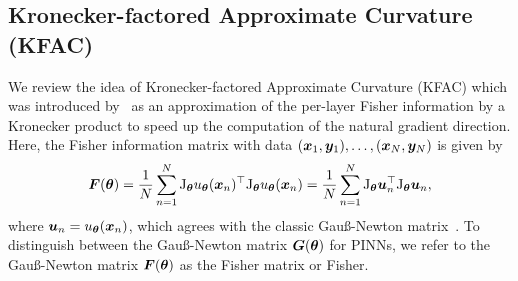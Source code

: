 \subsection{Kronecker-factored Approximate Curvature (KFAC)}


We review the idea of Kronecker-factored Approximate Curvature (KFAC) which was introduced by~\citet{heskes2000natural, martens2015optimizing} as an approximation of the per-layer Fisher information by a Kronecker product to speed up the computation of the natural gradient direction. 
Here, the Fisher information matrix with data $({\bm{x}}_1, {\bm{y}}_1), \dots, ({\bm{x}}_N, {\bm{y}}_N)$ is given by 
\begin{equation}
  {\bm{F}}({\bm{\theta}}) = \frac1N\sum_{n=1}^N \mathrm{J}_{{\bm{\theta}}} u_{{\bm{\theta}}}({\bm{x}}_n)^\top \mathrm{J}_{{\bm{\theta}}} u_{{\bm{\theta}}}({\bm{x}}_n) = \frac1N\sum_{n=1}^N \mathrm{J}_{{\bm{\theta}}} {\bm{u}}_n^\top \mathrm{J}_{{\bm{\theta}}} {\bm{u}}_n
  ,
 \end{equation}
where ${\bm{u}}_n = u_{\bm{\theta}}({\bm{x}}_n)$, which agrees with the %
classic Gauß-Newton matrix~\citep{martens2020new, eschenhagen2023kroneckerfactored}. 
To distinguish between the Gauß-Newton matrix ${\bm{G}}({\bm{\theta}})$ for PINNs, we refer to the Gauß-Newton matrix ${\bm{F}}({\bm{\theta}})$ as the Fisher matrix or Fisher. 


